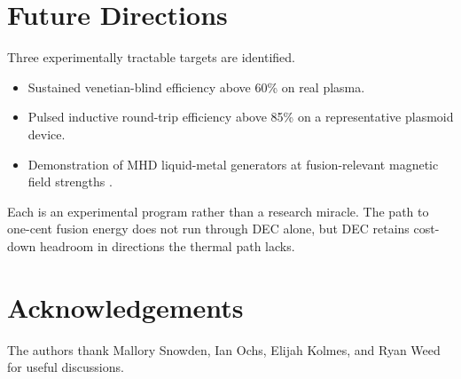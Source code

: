 \documentclass{article}
\begin{document}
\section{Future Directions}
\label{sec:future}

Three experimentally tractable targets are identified.
\begin{itemize}
\item Sustained venetian-blind efficiency above 60\% on real plasma.
\item Pulsed inductive round-trip efficiency above 85\% on a
representative plasmoid device.
\item Demonstration of MHD liquid-metal generators at
fusion-relevant magnetic field strengths
\citep{Smolentsev2022}.
\end{itemize}
Each is an experimental program rather than a research miracle.
The path to one-cent fusion energy does not run through DEC alone,
but DEC retains cost-down headroom in directions the thermal path
lacks.

\section*{Acknowledgements}
The authors thank Mallory Snowden, Ian Ochs, Elijah Kolmes, and
Ryan Weed for useful discussions.



\end{document}
